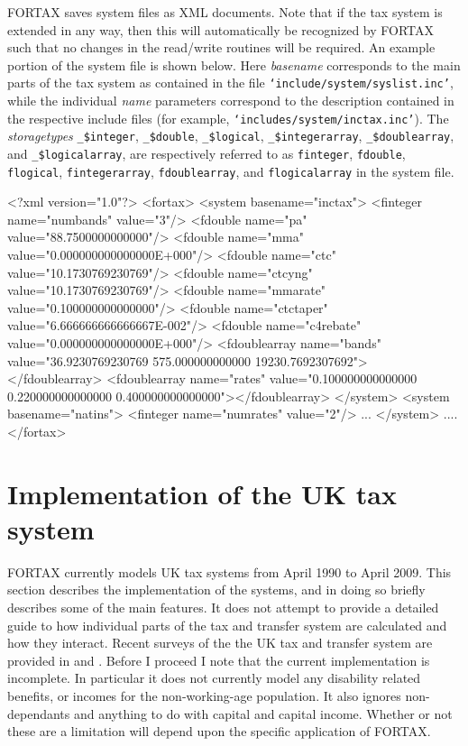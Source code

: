 \documentclass[11pt,thmsa,letter,ukenglish]{article}
\begin{document}
FORTAX saves system files as XML documents. Note that if the tax system is extended in any way, then this will automatically be recognized by FORTAX such that no changes in the read/write routines will be required. An example portion of the system file is shown below. Here \emph{basename} corresponds to the main parts of the tax system as contained in the file \texttt{`include/system/syslist.inc'}, while the individual \emph{name} parameters correspond to the description contained in the respective include files (for example, \texttt{`includes/system/inctax.inc'}). The \emph{storagetypes} \texttt{\_\$integer}, \texttt{\_\$double}, \texttt{\_\$logical}, \texttt{\_\$integerarray}, \texttt{\_\$doublearray}, and \texttt{\_\$logicalarray}, are respectively referred to as \texttt{finteger}, \texttt{fdouble}, \texttt{flogical}, \texttt{fintegerarray}, \texttt{fdoublearray}, and \texttt{flogicalarray} in the system file.

\begin{xmlcode}[title={Extract from example FORTAX system file}]
<?xml version="1.0"?>
<fortax>
<system basename="inctax">
   <finteger name="numbands" value="3"/>
   <fdouble name="pa" value="88.7500000000000"/>
   <fdouble name="mma" value="0.000000000000000E+000"/>
   <fdouble name="ctc" value="10.1730769230769"/>
   <fdouble name="ctcyng" value="10.1730769230769"/>
   <fdouble name="mmarate" value="0.100000000000000"/>
   <fdouble name="ctctaper" value="6.666666666666667E-002"/>
   <fdouble name="c4rebate" value="0.000000000000000E+000"/>
   <fdoublearray name="bands" value="36.9230769230769 575.000000000000 19230.7692307692"></fdoublearray>
   <fdoublearray name="rates" value="0.100000000000000 0.220000000000000 0.400000000000000"></fdoublearray>
</system>
<system basename="natins">
   <finteger name="numrates" value="2"/>
    ...
</system>
....
</fortax>
\end{xmlcode}

\section{Implementation of the UK tax system}\label{sec:uksys}

FORTAX currently models UK tax systems from April 1990 to April 2009. This section describes the implementation of the systems, and in doing so briefly describes some of the main features. It does not attempt to provide a detailed guide to how individual parts of the tax and transfer system are calculated and how they interact. Recent surveys of the the UK tax and transfer system are provided in \cite{adam+browne2009} and \cite{o'dea+phillips+vink2007}. Before I proceed I note that the current implementation is incomplete. In particular it does not currently model any disability related benefits, or incomes for the non-working-age population. It also ignores non-dependants and anything to do with capital and capital income. Whether or not these are a limitation will depend upon the specific application of FORTAX.
\end{document}
